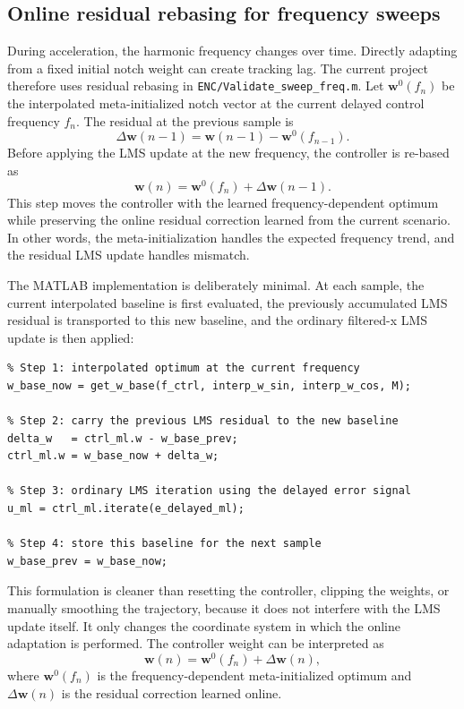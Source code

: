\documentclass{internoise2026}
\begin{document}
\subsection{Online residual rebasing for frequency sweeps}

During acceleration, the harmonic frequency changes over time. Directly adapting from a fixed initial notch weight can create tracking lag. The current project therefore uses residual rebasing in \texttt{ENC/Validate\_sweep\_freq.m}. Let $\mathbf{w}^{0}(f_n)$ be the interpolated meta-initialized notch vector at the current delayed control frequency $f_n$. The residual at the previous sample is
\begin{equation}
  \Delta\mathbf{w}(n-1)=
  \mathbf{w}(n-1)-\mathbf{w}^{0}(f_{n-1}).
  \label{eq:residual}
\end{equation}
Before applying the LMS update at the new frequency, the controller is re-based as
\begin{equation}
  \mathbf{w}(n)=
  \mathbf{w}^{0}(f_n)+\Delta\mathbf{w}(n-1).
  \label{eq:rebasing}
\end{equation}
This step moves the controller with the learned frequency-dependent optimum while preserving the online residual correction learned from the current scenario. In other words, the meta-initialization handles the expected frequency trend, and the residual LMS update handles mismatch.

The MATLAB implementation is deliberately minimal. At each sample, the current interpolated baseline is first evaluated, the previously accumulated LMS residual is transported to this new baseline, and the ordinary filtered-x LMS update is then applied:
\begin{verbatim}
% Step 1: interpolated optimum at the current frequency
w_base_now = get_w_base(f_ctrl, interp_w_sin, interp_w_cos, M);

% Step 2: carry the previous LMS residual to the new baseline
delta_w   = ctrl_ml.w - w_base_prev;
ctrl_ml.w = w_base_now + delta_w;

% Step 3: ordinary LMS iteration using the delayed error signal
u_ml = ctrl_ml.iterate(e_delayed_ml);

% Step 4: store this baseline for the next sample
w_base_prev = w_base_now;
\end{verbatim}

This formulation is cleaner than resetting the controller, clipping the weights, or manually smoothing the trajectory, because it does not interfere with the LMS update itself. It only changes the coordinate system in which the online adaptation is performed. The controller weight can be interpreted as
\begin{equation}
  \mathbf{w}(n)=\mathbf{w}^{0}(f_n)+\Delta\mathbf{w}(n),
  \label{eq:weight_decomposition}
\end{equation}
where $\mathbf{w}^{0}(f_n)$ is the frequency-dependent meta-initialized optimum and $\Delta\mathbf{w}(n)$ is the residual correction learned online.
\end{document}

